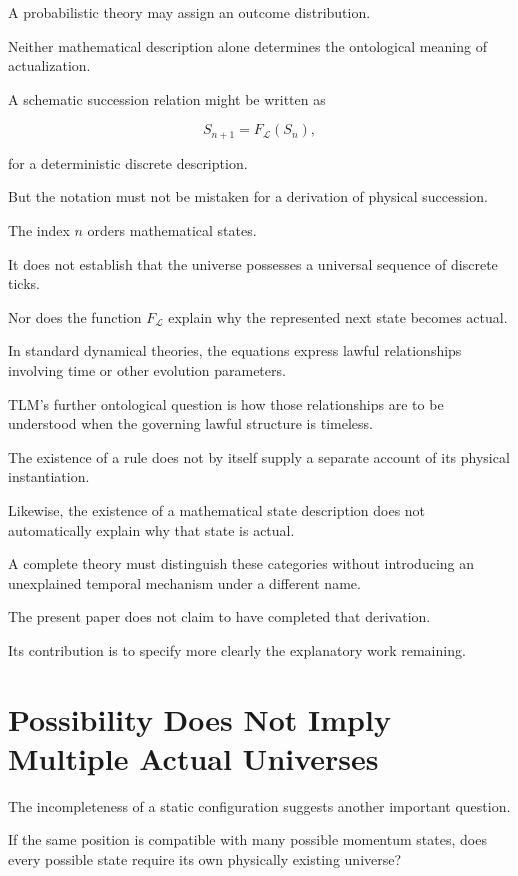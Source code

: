 \documentclass[12pt,onecolumn]{article}
\begin{document}
A probabilistic theory may assign an outcome distribution.

Neither mathematical description alone determines the ontological meaning of actualization.

A schematic succession relation might be written as

\begin{equation}
S_{n+1}=F_{\mathcal{L}}(S_n),
\end{equation}

for a deterministic discrete description.

But the notation must not be mistaken for a derivation of physical succession.

The index $n$ orders mathematical states.

It does not establish that the universe possesses a universal sequence of discrete ticks.

Nor does the function $F_{\mathcal{L}}$ explain why the represented next state becomes actual.

In standard dynamical theories, the equations express lawful relationships involving time or other evolution parameters.

TLM's further ontological question is how those relationships are to be understood when the governing lawful structure is timeless.

The existence of a rule does not by itself supply a separate account of its physical instantiation.

Likewise, the existence of a mathematical state description does not automatically explain why that state is actual.

A complete theory must distinguish these categories without introducing an unexplained temporal mechanism under a different name.

The present paper does not claim to have completed that derivation.

Its contribution is to specify more clearly the explanatory work remaining.


\section{Possibility Does Not Imply Multiple Actual Universes}

The incompleteness of a static configuration suggests another important question.

If the same position is compatible with many possible momentum states, does every possible state require its own physically existing universe?
\end{document}
